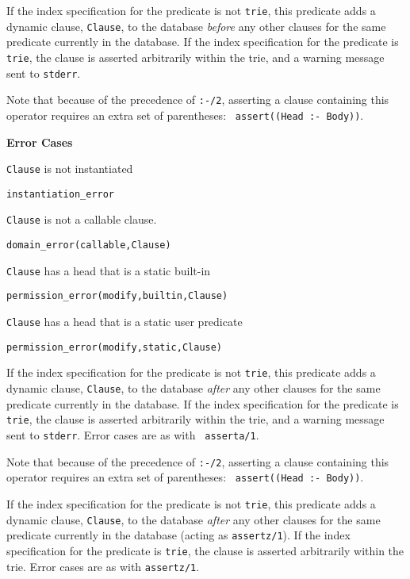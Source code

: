 \begin{description}
%
%
If the index specification for the predicate is not {\tt trie}, this
predicate adds a dynamic clause, {\tt Clause}, to the database {\em
before} any other clauses for the same predicate currently in the
database.  If the index specification for the predicate is {\tt trie},
the clause is asserted arbitrarily within the trie, and a warning
message sent to {\tt stderr}.

Note that because of the precedence of {\tt :-/2}, asserting a clause
containing this operator requires an extra set of parentheses: {\tt
  assert((Head :- Body))}.

{\bf Error Cases}
\bi
\item 	{\tt Clause} is not instantiated
\bi
\item 	{\tt instantiation\_error}
\ei
%
\item 	{\tt Clause} is not a callable clause.
\bi
\item 	{\tt domain\_error(callable,Clause)}
\ei
%
\item 	{\tt Clause} has a head that is a static built-in
\bi
\item 	{\tt permission\_error(modify,builtin,Clause)}
\ei
\item 	{\tt Clause} has a head that is a static user predicate
\bi
\item 	{\tt permission\_error(modify,static,Clause)}
\ei
%
\ei

%
If the index specification for the predicate is not {\tt trie}, this
predicate adds a dynamic clause, {\tt Clause}, to the database {\em
  after} any other clauses for the same predicate currently in the
database.  If the index specification for the predicate is {\tt trie},
the clause is asserted arbitrarily within the trie, and a warning
message sent to {\tt stderr}.  Error cases are as with {\tt
  asserta/1}.

Note that because of the precedence of {\tt :-/2}, asserting a clause
containing this operator requires an extra set of parentheses: {\tt
  assert((Head :- Body))}.

%
If the index specification for the predicate is not {\tt trie}, this
predicate adds a dynamic clause, {\tt Clause}, to the database {\em
  after} any other clauses for the same predicate currently in the
database (acting as {\tt assertz/1}).  If the index specification for
the predicate is {\tt trie}, the clause is asserted arbitrarily within
the trie.  Error cases are as with {\tt assertz/1}.


\end{description}
